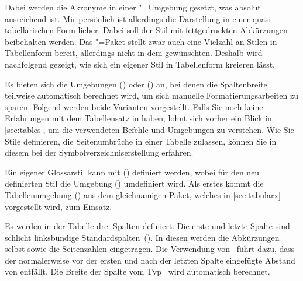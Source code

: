 \documentclass[%
  english,ngerman,%
  cdgeometry=no,DIV=12,automark,%
]{tudscrartcl}
\begin{document}
\begin{quoting}[rightmargin=0pt]
\glsdisablehyper
\printacronyms[style=simple]
\end{quoting}
%
Dabei werden die Akronyme in einer "=Umgebung gesetzt,
was absolut ausreichend ist. Mir persönlich ist allerdings die Darstellung in 
einer quasi-tabellarischen Form lieber. Dabei soll der Stil mit fettgedruckten 
Abkürzungen beibehalten werden. Das "=Paket stellt zwar 
auch eine Vielzahl an Stilen in Tabellenform bereit, allerdings nicht in dem 
gewünschten. Deshalb wird nachfolgend gezeigt, wie sich ein eigener Stil in 
Tabellenform kreieren lässt.

Es bieten sich die Umgebungen () oder 
() an, bei denen die Spaltenbreite teilweise 
automatisch berechnet wird, um sich manuelle Formatierungsarbeiten zu sparen. 
Folgend werden beide Varianten vorgestellt. Falls Sie noch keine Erfahrungen 
mit dem Tabellensatz in  haben, lohnt sich vorher ein Blick in 
\autoref{sec:tables}, um die verwendeten Befehle und Umgebungen zu verstehen. 
Wie Sie Stile definieren, die Seitenumbrüche in einer Tabelle zulassen, können 
Sie in diesem  bei der Symbolverzeichniserstellung 
erfahren.

Ein eigener Glossarstil kann mit () 
definiert werden, wobei für den neu definierten Stil die Umgebung 
() umdefiniert wird. Als erstes 
kommt die Tabellenumgebung () aus dem 
gleichnamigen Paket, welches in \autoref{sec:tabularx} vorgestellt wird, zum 
Einsatz.

Es werden in der Tabelle drei Spalten definiert. Die erste und letzte Spalte 
sind schlicht linksbündige Standardspalten~(). In diesen werden die 
Abkürzungen selbst sowie die Seitenzahlen eingetragen. Die Verwendung 
von~ führt dazu, dass der normalerweise vor der ersten 
und nach der letzten Spalte eingefügte Abstand von  entfällt. 
Die Breite der Spalte vom Typ~ wird automatisch berechnet.
\end{document}
